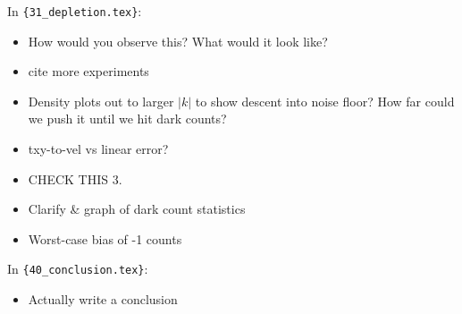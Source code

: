In \verb|{31_depletion.tex}|:
\begin{itemize}
\item {How would you observe this?  What would it look like?}
\item {cite more experiments}
\item {Density plots out to larger $|k|$ to show descent into noise floor? How far could we push it until we hit dark counts?}
\item {txy-to-vel vs linear error?}
\item {CHECK THIS 3.}
\item {Clarify \& graph of dark count statistics}
\item {Worst-case bias of -1 counts}
\end{itemize}
In \verb|{40_conclusion.tex}|:
\begin{itemize}
\item {Actually write a conclusion}
\end{itemize}
